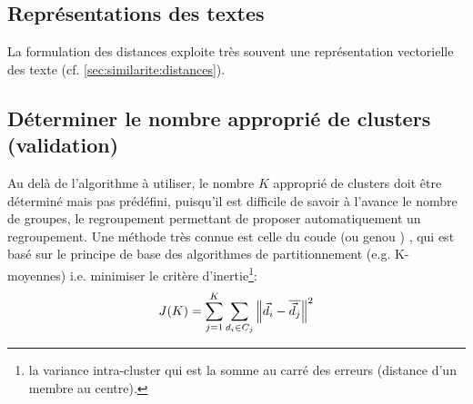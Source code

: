 
\subsection{Représentations des textes}
La formulation des distances exploite très souvent une représentation vectorielle des texte (cf.  \ref{sec:similarite:distances}). 


\subsection{Déterminer le nombre approprié de clusters (validation)}


 Au delà de l’algorithme à utiliser, le nombre $K$ approprié de clusters doit être déterminé mais pas prédéfini, puisqu'il est difficile de savoir à l'avance le nombre de groupes, le regroupement permettant de proposer automatiquement un regroupement. Une méthode très connue est celle du \og coude \fg{}  (ou \og genou \fg{}) \citep{halkidi2001clustvalidation}, qui est basé sur le principe de base des algorithmes de partitionnement (e.g. K-moyennes) i.e. minimiser le critère d'inertie\footnote{la variance intra-cluster qui est la somme au carré des erreurs (distance d'un membre au centre).}:
\[J(K) = \sum\limits_{j=1}^K\sum\limits_{d_i \in C_j}\left\lVert\vec{d}_i-\overline{\vec{d}_j}\right\rVert^2\]

